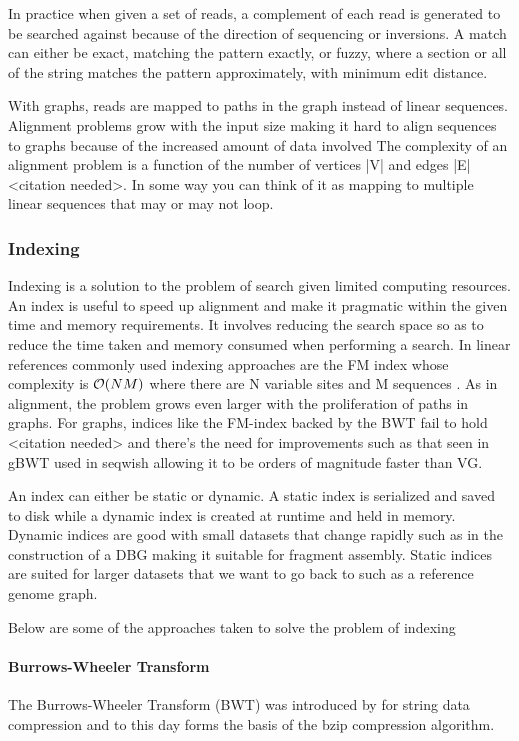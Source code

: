 \documentclass[10pt, a4paper]{article}
\begin{document}
In practice when given a set of reads, a complement of each read is generated to
be searched against because of the direction of sequencing or inversions.
A match can either be exact, matching the pattern exactly, or fuzzy, where a
section or all of the string matches the pattern approximately, with minimum
edit distance.

With graphs, reads are mapped to paths in the graph instead of linear sequences.
Alignment problems grow with the input size
\cite{durbinEfficientHaplotypeMatching2014} making it hard to align sequences to
graphs  because of the increased amount of data involved
The complexity of an alignment problem is a function of the
number of  vertices |V| and edges |E| <citation needed>.  In some way you can
think of it as mapping to multiple linear sequences that may or may not loop.

\subsubsection{Indexing}
\label{sec:org5bf7353}
Indexing is a solution to the problem of search given limited computing
resources. An index is useful to speed up alignment and make it pragmatic within
the given time and memory requirements.
It involves reducing the search space so as to reduce the time taken and memory
consumed when performing a search.
In linear references commonly used indexing approaches are the FM index
 whose complexity is \(\mathcal{O}(NM)\) where there are N variable
sites and M sequences \cite{durbinEfficientHaplotypeMatching2014}.
As in alignment, the problem grows even larger with the proliferation of paths
in graphs. For graphs, indices like the FM-index backed by the BWT fail to hold
<citation needed> and there’s the need for improvements such as that seen in
gBWT used in seqwish allowing it to be orders of magnitude faster than VG.

An index can either be static or dynamic. A static index is serialized and saved
to disk while a dynamic index is created at runtime and held in memory. Dynamic
indices are good with small datasets that change rapidly such as in the
construction of a DBG making it suitable for fragment assembly. Static indices
are suited for larger datasets that we want to go back to such as a reference
genome graph.

Below are some of the approaches taken to solve the problem of indexing
\paragraph{Burrows-Wheeler Transform}
\label{sec:orgc0d490e}
The Burrows-Wheeler Transform (BWT) was introduced by
\cite{burrowsBlocksortingLosslessData1994} for string data
compression and to this day forms the basis of the bzip compression algorithm.
\end{document}
